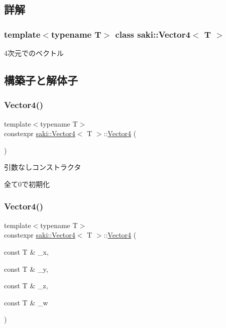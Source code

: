 \subsection{詳解}
\subsubsection*{template$<$typename T$>$\newline
class saki\+::\+Vector4$<$ T $>$}

4次元でのベクトル 

\subsection{構築子と解体子}
\mbox{\label{classsaki_1_1_vector4_a9e8579274314ee2639d60c501c8ecf61}} 
\subsubsection{\texorpdfstring{Vector4()}{Vector4()}\hspace{0.1cm}{\footnotesize\ttfamily [1/5]}}
{\footnotesize\ttfamily template$<$typename T$>$ \\
constexpr \mbox{\hyperlink{classsaki_1_1_vector4}{saki\+::\+Vector4}}$<$ T $>$\+::\mbox{\hyperlink{classsaki_1_1_vector4}{Vector4}} (\begin{DoxyParamCaption}{ }\end{DoxyParamCaption})\hspace{0.3cm}{\ttfamily [inline]}}



引数なしコンストラクタ 

全て0で初期化 \mbox{\label{classsaki_1_1_vector4_abbab45ef6d7c95d150c3e76eb241a666}} 
\subsubsection{\texorpdfstring{Vector4()}{Vector4()}\hspace{0.1cm}{\footnotesize\ttfamily [2/5]}}
{\footnotesize\ttfamily template$<$typename T$>$ \\
constexpr \mbox{\hyperlink{classsaki_1_1_vector4}{saki\+::\+Vector4}}$<$ T $>$\+::\mbox{\hyperlink{classsaki_1_1_vector4}{Vector4}} (\begin{DoxyParamCaption}\item[{const T \&}]{\+\_\+x,  }\item[{const T \&}]{\+\_\+y,  }\item[{const T \&}]{\+\_\+z,  }\item[{const T \&}]{\+\_\+w }\end{DoxyParamCaption})\hspace{0.3cm}{\ttfamily [inline]}}



